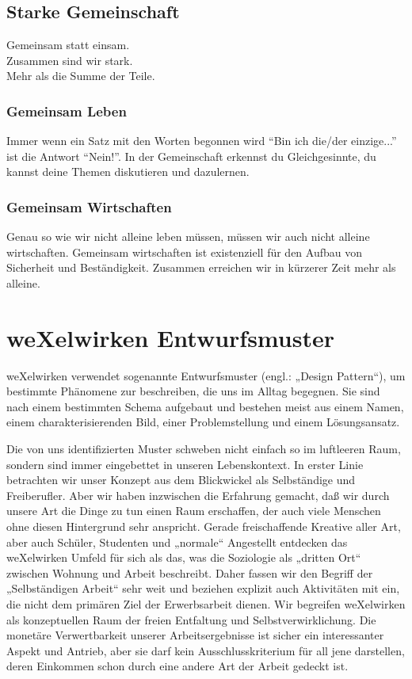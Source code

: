 {{    \subsection{Starke Gemeinschaft}
Gemeinsam statt einsam.\\
Zusammen sind wir stark.\\
Mehr als die Summe der Teile.\\
      \subsubsection{Gemeinsam Leben}
Immer wenn ein Satz mit den Worten begonnen wird "`Bin ich die/der einzige..."' ist die Antwort "`Nein!"'.
%
In der Gemeinschaft erkennst du Gleichgesinnte, du kannst deine Themen diskutieren und dazulernen.
      \subsubsection{Gemeinsam Wirtschaften}
Genau so wie wir nicht alleine leben müssen, müssen wir auch nicht alleine wirtschaften.
%
Gemeinsam wirtschaften ist existenziell für den Aufbau von Sicherheit und Beständigkeit.
%
Zusammen erreichen wir in kürzerer Zeit mehr als alleine.
 
  \section{weXelwirken Entwurfsmuster}
weXelwirken  verwendet  sogenannte  Entwurfsmuster (engl.:  „Design  Pattern“),  um  bestimmte Phänomene zur beschreiben, die uns im Alltag begegnen.
%
Sie sind nach einem bestimmten Schema aufgebaut  und  bestehen  meist  aus  einem  Namen,  einem  charakterisierenden  Bild,  einer Problemstellung und einem Lösungsansatz.
%



Die von uns identifizierten Muster schweben nicht einfach so im luftleeren Raum, sondern sind immer eingebettet  in  unseren  Lebenskontext.
%
In  erster  Linie  betrachten  wir  unser  Konzept  aus  dem Blickwickel als Selbständige und Freiberufler.
%
Aber wir haben inzwischen die Erfahrung gemacht, daß wir durch unsere Art die Dinge zu tun einen Raum erschaffen, der auch viele Menschen ohne diesen 
Hintergrund sehr anspricht.
%
Gerade freischaffende Kreative aller Art, aber auch Schüler, Studenten und „normale“ Angestellt entdecken das weXelwirken Umfeld für sich als das, was die Soziologie als „dritten Ort“ zwischen Wohnung und Arbeit beschreibt.
%
Daher fassen wir den Begriff der „Selbständigen Arbeit“ sehr weit und beziehen explizit auch Aktivitäten mit ein, die nicht dem primären Ziel der Erwerbsarbeit dienen.
%
Wir begreifen weXelwirken als konzeptuellen Raum der freien Entfaltung und Selbstverwirklichung.
%
Die monetäre Verwertbarkeit unserer  Arbeitsergebnisse  ist  sicher  ein  interessanter  Aspekt  und  Antrieb,  aber  sie  darf  kein 
Ausschlusskriterium für all jene darstellen, deren Einkommen schon durch eine andere Art der Arbeit gedeckt ist.
%



}}
